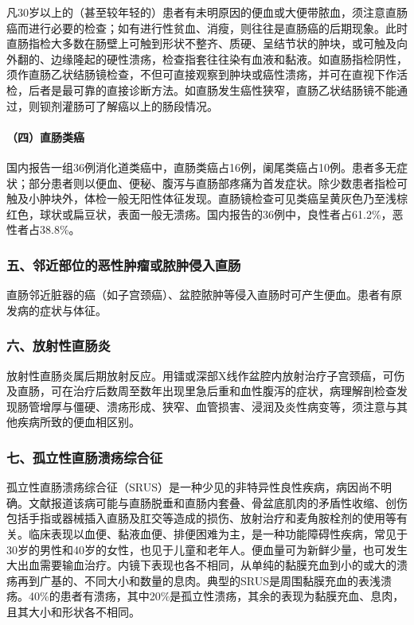 凡30岁以上的（甚至较年轻的）患者有未明原因的便血或大便带脓血，须注意直肠癌而进行必要的检查；如有进行性贫血、消瘦，则往往是直肠癌的后期现象。此时直肠指检大多数在肠壁上可触到形状不整齐、质硬、呈结节状的肿块，或可触及向外翻的、边缘隆起的硬性溃疡，检查指套往往染有血液和黏液。如直肠指检阴性，须作直肠乙状结肠镜检查，不但可直接观察到肿块或癌性溃疡，并可在直视下作活检，后者是最可靠的直接诊断方法。如直肠发生癌性狭窄，直肠乙状结肠镜不能通过，则钡剂灌肠可了解癌以上的肠段情况。

\paragraph{（四）直肠类癌}

国内报告一组36例消化道类癌中，直肠类癌占16例，阑尾类癌占10例。患者多无症状；部分患者则以便血、便秘、腹泻与直肠部疼痛为首发症状。除少数患者指检可触及小肿块外，体检一般无阳性体征发现。直肠镜检查可见类癌呈黄灰色乃至浅棕红色，球状或扁豆状，表面一般无溃疡。国内报告的36例中，良性者占61.2\%，恶性者占38.8\%。

\subsubsection{五、邻近部位的恶性肿瘤或脓肿侵入直肠}

直肠邻近脏器的癌（如子宫颈癌）、盆腔脓肿等侵入直肠时可产生便血。患者有原发病的症状与体征。

\subsubsection{六、放射性直肠炎}

放射性直肠炎属后期放射反应。用镭或深部X线作盆腔内放射治疗子宫颈癌，可伤及直肠，可在治疗后数周至数年出现里急后重和血性腹泻的症状，病理解剖检查发现肠管增厚与僵硬、溃疡形成、狭窄、血管损害、浸润及炎性病变等，须注意与其他疾病所致的便血相区别。

\subsubsection{七、孤立性直肠溃疡综合征}

孤立性直肠溃疡综合征（SRUS）是一种少见的非特异性良性疾病，病因尚不明确。文献报道该病可能与直肠脱垂和直肠内套叠、骨盆底肌肉的矛盾性收缩、创伤包括手指或器械插入直肠及肛交等造成的损伤、放射治疗和麦角胺栓剂的使用等有关。临床表现以血便、黏液血便、排便困难为主，是一种功能障碍性疾病，常见于30岁的男性和40岁的女性，也见于儿童和老年人。便血量可为新鲜少量，也可发生大出血需要输血治疗。内镜下表现也各不相同，从单纯的黏膜充血到小的或大的溃疡再到广基的、不同大小和数量的息肉。典型的SRUS是周围黏膜充血的表浅溃疡。40\%的患者有溃疡，其中20\%是孤立性溃疡，其余的表现为黏膜充血、息肉，且其大小和形状各不相同。

